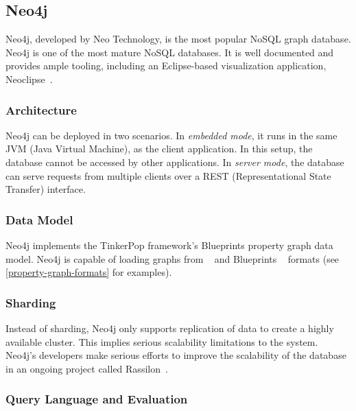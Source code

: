 
\subsection{Neo4j}
\label{neo4j}

Neo4j, developed by Neo Technology, is the most popular NoSQL graph database. Neo4j is one of the most mature NoSQL databases. It is well documented and provides ample tooling, including an Eclipse-based visualization application, Neoclipse~\cite{Neoclipse}.

\subsubsection{Architecture}

Neo4j can be deployed in two scenarios. In \emph{embedded mode}, it runs in the same JVM (Java Virtual Machine), as the client application. In this setup, the database cannot be accessed by other applications. In \emph{server mode}, the database can serve requests from multiple clients over a REST (Representational State Transfer) interface.

\subsubsection{Data Model}

Neo4j implements the TinkerPop framework's Blueprints property graph data model. Neo4j is capable of loading graphs from \graphml{}~\cite{GraphML} and Blueprints \graphson{}~\cite{BlueprintsGraphSON} formats (see \autoref{property-graph-formats} for examples). 

\subsubsection{Sharding}

Instead of sharding, Neo4j only supports replication of data to create a highly available cluster. This implies serious scalability limitations to the system. Neo4j's developers make serious efforts to improve the scalability of the database in an ongoing project called Rassilon~\cite{rassilon}.

\subsubsection{Query Language and Evaluation}

